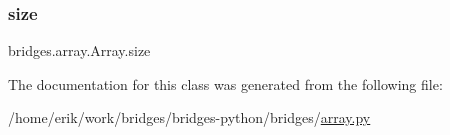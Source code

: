 \subsubsection{\texorpdfstring{size}{size}}
{\footnotesize\ttfamily bridges.\+array.\+Array.\+size}



The documentation for this class was generated from the following file\+:\begin{DoxyCompactItemize}
\item 
/home/erik/work/bridges/bridges-\/python/bridges/\hyperlink{array_8py}{array.\+py}\end{DoxyCompactItemize}
